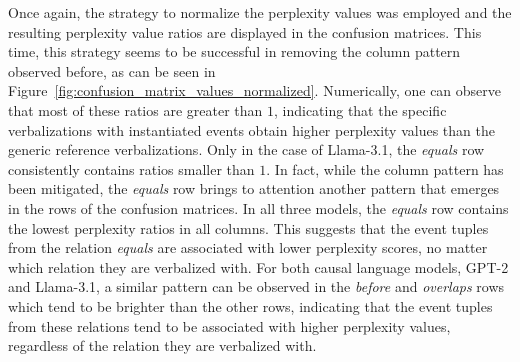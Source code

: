 \documentclass[11pt]{article}
\begin{document}
Once again, the strategy to normalize the perplexity values was employed and the resulting perplexity value ratios are displayed in the confusion matrices.
This time, this strategy seems to be successful in removing the column pattern observed before, as can be seen in Figure~\ref{fig:confusion_matrix_values_normalized}. Numerically, one can observe that most of these ratios are greater than $1$, indicating that the specific verbalizations with instantiated events obtain higher perplexity values than the generic reference verbalizations. Only in the case of Llama-3.1, the \textit{equals} row consistently contains ratios smaller than $1$.
In fact, while the column pattern has been mitigated, the \textit{equals} row brings to attention another pattern that emerges in the rows of the confusion matrices. In all three models, the \textit{equals} row contains the lowest perplexity ratios in all columns. This suggests that the event tuples from the relation \textit{equals} are associated with lower perplexity scores, no matter which relation they are verbalized with. For both causal language models, GPT-2 and Llama-3.1, a similar pattern can be observed in the \textit{before} and \textit{overlaps} rows which tend to be brighter than the other rows, indicating that the event tuples from these relations tend to be associated with higher perplexity values, regardless of the relation they are verbalized with.
\end{document}
